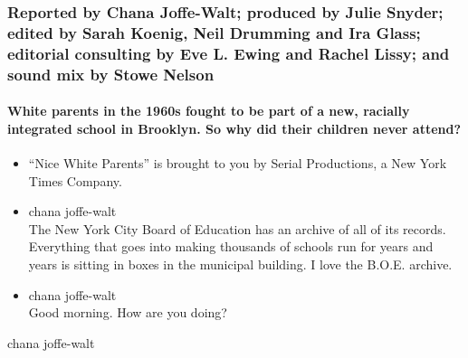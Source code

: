 \hypertarget{reported-by-chana-joffe-walt-produced-by-julie-snyder-edited-by-sarah-koenig-neil-drumming-and-ira-glass-editorial-consulting-by-eve-l-ewing-and-rachel-lissy-and-sound-mix-by-stowe-nelson-1}{%
\subsubsection{Reported by Chana Joffe-Walt; produced by Julie Snyder;
edited by Sarah Koenig, Neil Drumming and Ira Glass; editorial
consulting by Eve L. Ewing and Rachel Lissy; and sound mix by Stowe
Nelson}\label{reported-by-chana-joffe-walt-produced-by-julie-snyder-edited-by-sarah-koenig-neil-drumming-and-ira-glass-editorial-consulting-by-eve-l-ewing-and-rachel-lissy-and-sound-mix-by-stowe-nelson-1}}

\hypertarget{white-parents-in-the-1960s-fought-to-be-part-of-a-new-racially-integrated-school-in-brooklyn-so-why-did-their-children-never-attend}{%
\paragraph{White parents in the 1960s fought to be part of a new,
racially integrated school in Brooklyn. So why did their children never
attend?}\label{white-parents-in-the-1960s-fought-to-be-part-of-a-new-racially-integrated-school-in-brooklyn-so-why-did-their-children-never-attend}}

\begin{itemize}
\item
  ``Nice White Parents'' is brought to you by Serial Productions, a New
  York Times Company.
\item
  chana joffe-walt\\
  The New York City Board of Education has an archive of all of its
  records. Everything that goes into making thousands of schools run for
  years and years is sitting in boxes in the municipal building. I love
  the B.O.E. archive.
\item
  chana joffe-walt\\
  Good morning. How are you doing?
\end{itemize}

chana joffe-walt

